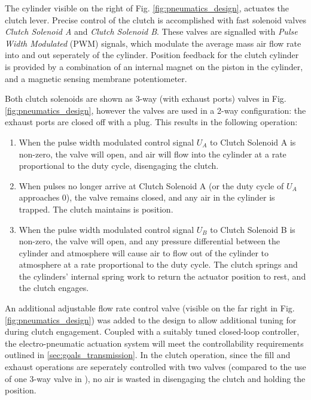 The cylinder visible on the right of Fig. \ref{fig:pneumatics_design}, actuates the clutch lever. Precise control of the clutch is accomplished with fast solenoid valves \emph{Clutch Solenoid A} and \emph{Clutch Solenoid B}. These valves are signalled with \emph{Pulse Width Modulated} (PWM) signals, which modulate the average mass air flow rate into and out seperately of the cylinder. Position feedback for the clutch cylinder is provided by a combination of an internal magnet on the piston in the cylinder, and a magnetic sensing membrane potentiometer.

Both clutch solenoids are shown as 3-way (with exhaust ports) valves in Fig. \ref{fig:pneumatics_design}, however the valves are used in a 2-way configuration: the exhaust ports are closed off with a plug. This results in the following operation:
\begin{enumerate}
  \item When the pulse width modulated control signal $U_A$ to Clutch Solenoid A is non-zero, the valve will open, and air will flow into the cylinder at a rate proportional to the duty cycle, disengaging the clutch.
  \item When pulses no longer arrive at Clutch Solenoid A (or the duty cycle of $U_A$ approaches 0), the valve remains closed, and any air in the cylinder is trapped. The clutch maintains is position.
  \item When the pulse width modulated control signal $U_B$ to Clutch Solenoid B is non-zero, the valve will open, and any pressure differential between the cylinder and atmosphere will cause air to flow out of the cylinder to atmosphere at a rate proportional to the duty cycle. The clutch springs and the cylinders' internal spring work to return the actuator position to rest, and the clutch engages.
\end{enumerate}

An additional adjustable flow rate control valve (visible on the far right in Fig. \ref{fig:pneumatics_design}) was added to the design to allow additional tuning for during clutch engagement. Coupled with a suitably tuned closed-loop controller, the electro-pneumatic actuation system will meet the controllability requirements outlined in \ref{sec:goals_transmission}. In the clutch operation, since the fill and exhaust operations are seperately controlled with two valves (compared to the use of one 3-way valve in \cite{accurate_position}), no air is wasted in disengaging the clutch and holding the position.


